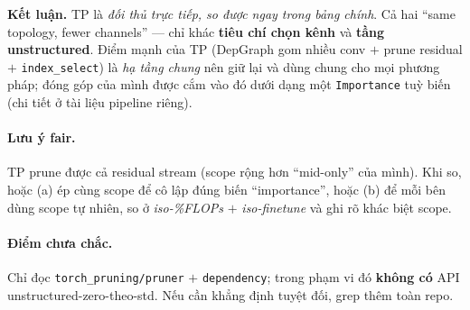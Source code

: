 \documentclass[11pt,a4paper]{article}
\newcommand{\code}[1]{\texttt{#1}}
\begin{document}
\noindent\textbf{Kết luận.} TP là \emph{đối thủ trực tiếp, so được ngay trong bảng chính}. Cả hai
``same topology, fewer channels'' --- chỉ khác \textbf{tiêu chí chọn kênh} và \textbf{tầng
unstructured}. Điểm mạnh của TP (DepGraph gom nhiều conv $+$ prune residual $+$ \code{index\_select})
là \emph{hạ tầng chung} nên giữ lại và dùng chung cho mọi phương pháp; đóng góp của mình được cắm vào
đó dưới dạng một \code{Importance} tuỳ biến (chi tiết ở tài liệu pipeline riêng).

\paragraph{Lưu ý fair.} TP prune được cả residual stream (scope rộng hơn ``mid-only'' của mình).
Khi so, hoặc (a) ép cùng scope để cô lập đúng biến ``importance'', hoặc (b) để mỗi bên dùng scope tự
nhiên, so ở \emph{iso-\%FLOPs} $+$ \emph{iso-finetune} và ghi rõ khác biệt scope.

\paragraph{Điểm chưa chắc.} Chỉ đọc \code{torch\_pruning/pruner} $+$ \code{dependency}; trong phạm vi
đó \textbf{không có} API unstructured-zero-theo-std. Nếu cần khẳng định tuyệt đối, grep thêm toàn repo.
\end{document}

